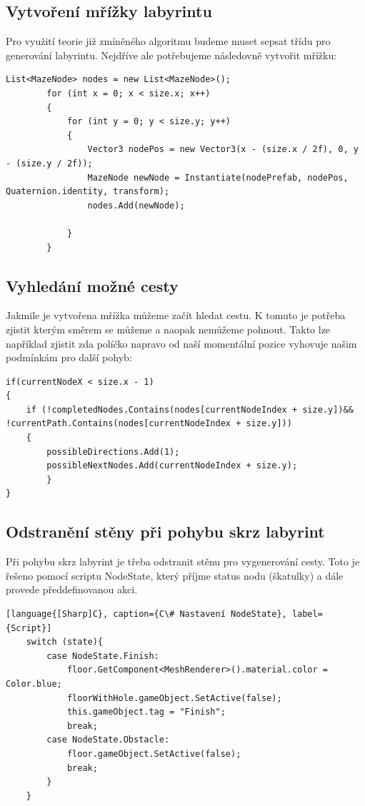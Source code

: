 \documentclass[12pt, a4paper,
twoside        %
]{report}
\begin{document}
\vspace{0.1in}


\subsection{Vytvoření mřížky labyrintu}
Pro využití teorie již zmíněného algoritmu budeme muset sepsat třídu pro generování labyrintu. Nejdříve ale potřebujeme 
následovně vytvořit mřížku:
\begin{lstlisting}[language={[Sharp]C}, caption={C\# Vytvoření nodů (mřížky)}, label={Script}]
List<MazeNode> nodes = new List<MazeNode>();
        for (int x = 0; x < size.x; x++)
        {
            for (int y = 0; y < size.y; y++)
            {
                Vector3 nodePos = new Vector3(x - (size.x / 2f), 0, y - (size.y / 2f));
                MazeNode newNode = Instantiate(nodePrefab, nodePos, Quaternion.identity, transform);
                nodes.Add(newNode);

            }
        }
\end{lstlisting}

\subsection{Vyhledání možné cesty}
Jakmile je vytvořena mřížka můžeme začít hledat cestu. K tomuto je potřeba zjistit kterým směrem se můžeme a naopak nemůžeme pohnout. Takto lze například zjistit zda políčko napravo od naší momentální pozice vyhovuje našim podmínkám pro další pohyb:

\begin{lstlisting}[language={[Sharp]C}, caption={C\# příklad hledání cesty}, label={Script}]
if(currentNodeX < size.x - 1)
{
    if (!completedNodes.Contains(nodes[currentNodeIndex + size.y])&& !currentPath.Contains(nodes[currentNodeIndex + size.y]))
    {
        possibleDirections.Add(1);
        possibleNextNodes.Add(currentNodeIndex + size.y);
        }
}   
\end{lstlisting}

\vspace{1in}

\subsection{Odstranění stěny při pohybu skrz labyrint}
Při pohybu skrz labyrint je třeba odstranit stěnu pro vygenerování cesty. Toto je řešeno pomocí scriptu NodeState, který příjme status nodu (škatulky) a dále provede předdefinovanou akci.
\begin{lstlisting}[language{[Sharp]C}, caption={C\# Nastavení NodeState}, label={Script}]
    switch (state){
        case NodeState.Finish:
            floor.GetComponent<MeshRenderer>().material.color = Color.blue;
            floorWithHole.gameObject.SetActive(false);
            this.gameObject.tag = "Finish";
            break;
        case NodeState.Obstacle:
            floor.gameObject.SetActive(false);
            break;
        }
    }
\end{lstlisting}
\end{document}
